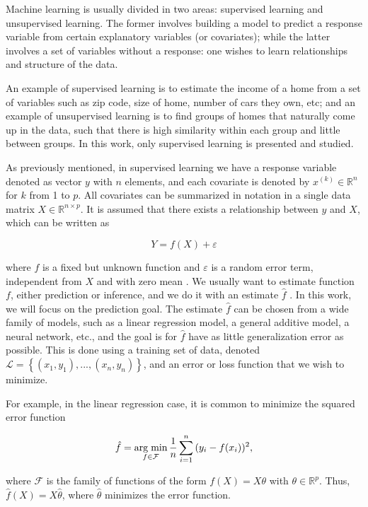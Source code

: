 Machine learning is usually divided in two areas: supervised learning and unsupervised learning. The former involves building a model to predict a response variable from certain explanatory variables (or covariates); while the latter involves a set of variables without a response: one wishes to learn relationships and structure of the data.

An example of supervised learning is to estimate the income of a home from a set of variables such as zip code, size of home, number of cars they own, etc; and an example of unsupervised learning is to find groups of homes that naturally come up in the data, such that there is high similarity within each group and little between groups. In this work, only supervised learning is presented and studied.

As previously mentioned, in supervised learning we have a response variable denoted as vector $y$ with $n$ elements, and each covariate is denoted by $x^{(k)} \in \mathbb{R}^n$ for $k$ from 1 to $p$. All covariates can be summarized in notation in a single data matrix $X \in \mathbb{R}^{n \times p}$. It is assumed that there exists a relationship between $y$ and $X$, which can be written as

\begin{equation}
  \label{eq:general_learning_model}
  Y = f(X) + \varepsilon
\end{equation}

where $f$ is a fixed but unknown function and $\varepsilon$ is a random error term, independent from $X$ and with zero mean \cite[p.~16]{james2013introduction}. We usually want to estimate function $f$, either prediction or inference, and we do it with an estimate $\hat{f}$ \cite[p.~17]{james2013introduction}.
In this work, we will focus on the prediction goal.
The estimate $\hat{f}$ can be chosen from a wide family of models, such as a linear regression model, a general additive model, a neural network, etc., and the goal is for $\hat{f}$ have as little generalization error as possible. This is done using a training set of data, denoted $\mathcal{L} = \left\{ (x_1, y_1), ..., (x_n, y_n) \right\}$, and an error or loss function that we wish to minimize.

For example, in the linear regression case, it is common to minimize the squared error function

$$
  \hat{f} = \operatorname*{arg\; min}_{f \in \mathcal{F}} \frac{1}{n} \sum_{i = 1}^n{ ( y_i - f(x_i) ) ^ 2},
$$

where $\mathcal{F}$ is the family of functions of the form $f(X) = X\theta$ with $\theta \in \mathbb{R}^p$. Thus, $\hat{f}(X) = X \hat{\theta}$, where $\hat{\theta}$ minimizes the error function.

